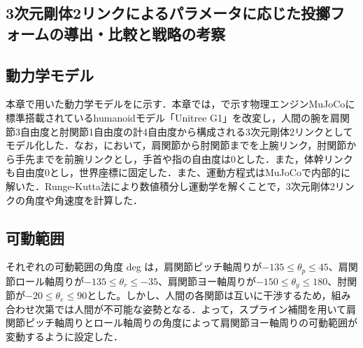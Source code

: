 \begin{small}
\section{3次元剛体2リンクによるパラメータに応じた投擲フォームの導出・比較と戦略の考察}
\subsection{動力学モデル}
本章で用いた動力学モデルをに示す．本章では，で示す物理エンジンMuJoCo\cite{mujoco}に標準搭載されているhumanoidモデル「Unitree G1」\cite{unitreeg1}を改変し，人間の腕を肩関節3自由度と肘関節1自由度の計4自由度から構成される3次元剛体2リンクとしてモデル化した．なお，において，肩関節から肘関節までを上腕リンク，肘関節から手先までを前腕リンクとし，手首や指の自由度は0とした．また，体幹リンクも自由度0とし，世界座標に固定した．また、運動方程式はMuJoCoで内部的に解いた．Runge-Kutta法により数値積分し運動学を解くことで，3次元剛体2リンクの角度や角速度を計算した．
\subsection{可動範囲}
それぞれの可動範囲の角度 deg は，肩関節ピッチ軸周りが$-135\leq\theta_{p}\leq45$、肩関節ロール軸周りが$-135\leq\theta_{r}\leq-35$、肩関節ヨー軸周りが$-150\leq\theta_{y}\leq180$、肘関節が$-20\leq\theta_{e}\leq90$とした。しかし、人間の各関節は互いに干渉するため，組み合わせ次第では人間が不可能な姿勢となる．よって，スプライン補間\cite{spline}を用いて肩関節ピッチ軸周りとロール軸周りの角度によって肩関節ヨー軸周りの可動範囲が変動するように設定した．

\end{small}
